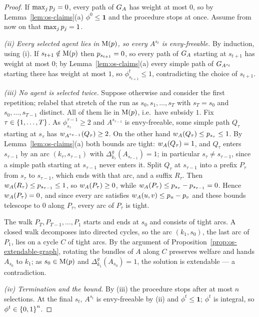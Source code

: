 \begin{proof}
If $\max_jp_j=0$, every path of $G_{A}$ has weight at most $0$,
so by Lemma~\ref{lem:os-claims}(a) $\phi^0\le\mathbf 1$ and the procedure stops
at once. Assume from now on that $\max_jp_j=1$.

\emph{(ii) Every selected agent lies in $\mathrm{M}(p)$, so every $A^{s_t}$
is envy-freeable.} By induction, using (i). If $s_{t+1}\notin\mathrm{M}(p)$
then $p_{s_{t+1}}=0$, so every path of $G_{A}$ starting at
$s_{t+1}$ has weight at most $0$; by Lemma~\ref{lem:os-claims}(a) every simple
path of $G_{A^{s_t}}$ starting there has weight at most $1$, so
$\phi^t_{s_{t+1}}\le1$, contradicting the choice of $s_{t+1}$.

\emph{(iii) No agent is selected twice.} Suppose otherwise and consider the
first repetition; relabel that stretch of the run as $s_0,s_1,\dots,s_T$ with
$s_T=s_0$ and $s_0,\dots,s_{T-1}$ distinct. All of them lie in
$\mathrm{M}(p)$, i.e.\ have subsidy $1$. Fix $\tau\in\left\{1,\dots,T\right\}$. As
$\phi^{\tau-1}_{s_\tau}\ge2$ and $A^{s_{\tau-1}}$ is envy-freeable, some simple
path $Q_\tau$ starting at $s_\tau$ has $w_{A^{s_{\tau-1}}}(Q_\tau)\ge2$. On
the other hand $w_{A}(Q_\tau)\le p_{s_\tau}\le1$. By
Lemma~\ref{lem:os-claims}(a) both bounds are tight: $w_{A}(Q_\tau)=1$, and
$Q_\tau$ enters $s_{\tau-1}$ by an arc $(k_\tau,s_{\tau-1})$ with
$\Delta_{k_\tau}^g(A_{s_{\tau-1}})=1$; in particular $s_\tau\ne s_{\tau-1}$,
since a simple path starting at $s_{\tau-1}$ never enters it. Split $Q_\tau$ at $s_{\tau-1}$ into a
prefix $P_\tau$ from $s_\tau$ to $s_{\tau-1}$, which ends with that arc, and a
suffix $R_\tau$. Then $w_{A}(R_\tau)\le p_{s_{\tau-1}}\le1$, so
$w_{A}(P_\tau)\ge0$, while
$w_{A}(P_\tau)\le p_{s_\tau}-p_{s_{\tau-1}}=0$. Hence
$w_{A}(P_\tau)=0$, and since every arc satisfies
$w_{A}(u,v)\le p_u-p_v$ and these bounds telescope to $0$
along $P_\tau$, every arc of $P_\tau$ is tight.

The walk $P_T,P_{T-1},\dots,P_1$ starts and ends at $s_0$ and consists of tight
arcs. A closed walk decomposes into directed cycles, so the arc
$(k_1,s_0)$, the last arc of $P_1$, lies on a cycle $C$ of tight arcs. By the
argument of Proposition~\ref{prop:os-extendable-graph}, rotating the bundles
of $A$ along $C$ preserves welfare and hands $A_{s_0}$ to $k_1$; as
$s_0\in\mathrm{M}(p)$ and $\Delta_{k_1}^g(A_{s_0})=1$, the solution is
extendable --- a contradiction.

\emph{(iv) Termination and the bound.} By (iii) the procedure stops after at
most $n$ selections. At the final $s_t$, $A^{s_t}$ is envy-freeable by (ii)
and $\phi^t\le\mathbf 1$; $\phi^t$ is integral, so $\phi^t\in\left\{0,1\right\}^n$.


\end{proof}
